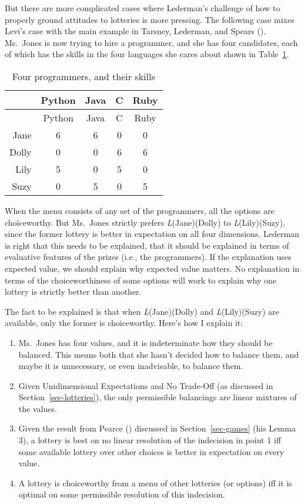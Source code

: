 \documentclass[
  11pt,
  letterpaper,
  DIV=11,
  numbers=noendperiod,
  twoside]{scrartcl}
\providecommand{\tightlist}{%
  \setlength{\itemsep}{0pt}\setlength{\parskip}{0pt}}
\begin{document}
But there are more complicated cases where Lederman's challenge of how
to properly ground attitudes to lotteries is more pressing. The
following case mixes Levi's case with the main example in Tarsney,
Lederman, and Spears ().
Ms.~Jones is now trying to hire a programmer, and she has four
candidates, each of which has the skills in the four languages she cares
about shown in Table~\ref{tbl-programmers}.

\begin{longtable}[]{@{}rcccc@{}}
\caption{Four programmers, and their
skills}\label{tbl-programmers}\tabularnewline
\toprule\noalign{}
& Python & Java & C & Ruby \\
\midrule\noalign{}
\endfirsthead
\toprule\noalign{}
& Python & Java & C & Ruby \\
\midrule\noalign{}
\endhead
\bottomrule\noalign{}
\endlastfoot
Jane & 6 & 6 & 0 & 0 \\
Dolly & 0 & 0 & 6 & 6 \\
Lily & 5 & 0 & 5 & 0 \\
Suzy & 0 & 5 & 0 & 5 \\
\end{longtable}

When the menu consists of any set of the programmers, all the options
are choiceworthy. But Ms.~Jones strictly prefers \emph{L}(Jane)(Dolly)
to \emph{L}(Lily)(Suzy), since the former lottery is better in
expectation on all four dimensions. Lederman is right that this needs to
be explained, that it should be explained in terms of evaluative
features of the prizes (i.e., the programmers). If the explanation uses
expected value, we should explain why expected value matters. No
explanation in terms of the choiceworthiness of some options will work
to explain why one lottery is strictly better than another.

The fact to be explained is that when \emph{L}(Jane)(Dolly) and
\emph{L}(Lily)(Suzy) are available, only the former is choiceworthy.
Here's how I explain it:

\begin{enumerate}
\def\labelenumi{\arabic{enumi}.}
\tightlist
\item
  Ms.~Jones has four values, and it is indeterminate how they should be
  balanced. This means both that she hasn't decided how to balance them,
  and maybe it is unnecessary, or even inadvisable, to balance them.
\item
  Given Unidimensional Expectations and No Trade-Off (as discussed in
  Section~\ref{sec-lotteries}), the only permissible balancings are
  linear mixtures of the values.
\item
  Given the result from Pearce ()
  discussed in Section~\ref{sec-games} (his Lemma 3), a lottery is best
  on no linear resolution of the indecision in point 1 iff some
  available lottery over other choices is better in expectation on every
  value.
\item
  A lottery is choiceworthy from a menu of other lotteries (or options)
  iff it is optimal on some permissible resolution of this indecision.
\end{enumerate}
\end{document}

